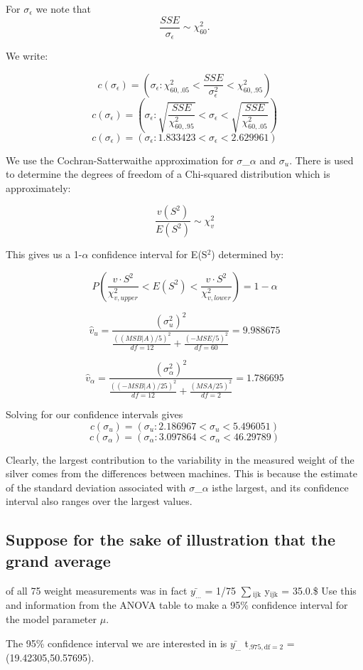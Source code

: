 \documentclass[11pt]{article}
\begin{document}
For $\sigma$$_{\epsilon}$ we note that 
$$\frac{SSE}{\sigma_{\epsilon}} \sim \chi^2_{60}.$$ 

We write:

$$c(\sigma_{\epsilon}) = \left( \sigma_{\epsilon} : \chi^2_{60,.05} < \frac{SSE}{\sigma^2_{\epsilon}} < \chi^2_{60,.95} \right)$$
$$c(\sigma_{\epsilon}) = \left( \sigma_{\epsilon} : \sqrt{\frac{SSE}{\chi^2_{60,.95}}} < \sigma_{\epsilon} < \sqrt{\frac{SSE}{\chi^2_{60,.05}}} \right)$$
$$c(\sigma_{\epsilon}) = \left( \sigma_{\epsilon} : 1.833423 <
\sigma_{\epsilon} < 2.629961 \right)$$

We use the Cochran-Satterwaithe approximation for $\sigma$_$\alpha$ and
$\sigma$$_u$. There  is used to determine the degrees of freedom
of a Chi-squared distribution which is approximately:

$$\frac{v(S^2)}{E(S^2)} \sim \chi^2_v$$

This gives us a 1-$\alpha$ confidence interval for E(S$^2$) determined by:

$$P\left( \frac{v \cdot S^2}{\chi^2_{v,upper}} < E(S^2) < \frac{v \cdot S^2}{\chi^2_{v,lower}} \right)=1-\alpha$$

$$\hat{v}_u =
\frac{(\sigma^2_u)^2}{\frac{((MSB|A)/5)^2}{df=12}+\frac{(-MSE/5)^2}{df=60}}
= 9.988675$$

$$\hat{v}_\alpha =
\frac{(\sigma^2_\alpha)^2}{\frac{((-MSB|A)/25)^2}{df=12}+\frac{(MSA/25)^2}{df=2}}
= 1.786695$$

Solving for our confidence intervals gives 
$$c(\sigma_u) = (\sigma_u : 2.186967 < \sigma_u < 5.496051)$$
$$c(\sigma_\alpha) = (\sigma_\alpha : 3.097864 < \sigma_\alpha < 46.29789)$$

Clearly, the largest contribution to the variability in the measured
weight of the silver comes from the differences between machines.
This is because the estimate of the standard deviation associated
with $\sigma$_$\alpha$ isthe largest, and its confidence interval also
ranges over the largest values.
\subsection{Suppose for the sake of illustration that the grand average}
\label{sec-2-3}

of all 75 weight measurements was in fact $\bar{y_\ldots}$ = 1/75
$\sum$$_{\mathrm{ijk}}$ y$_{\mathrm{ijk}}$ = 35.0.\$ Use this and information from the ANOVA
table to make a 95\% confidence interval for the model parameter $\mu$.

The 95\% confidence interval we are interested in is $\bar{y_\ldots}$
\textpm{} t$_{\mathrm{.975,df=2}}$  = (19.42305,50.57695).
\end{document}
